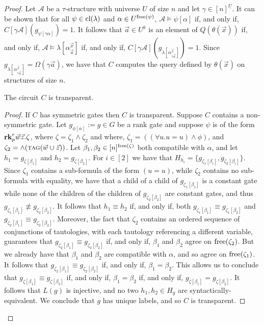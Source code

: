 \documentclass[../paper.tex]{subfiles}
\begin{document}
\begin{proof}
Let $\mathcal{A}$ be a $\tau$-structure with universe $U$ of size $n$ and let
$\gamma \in [n]^{\underline{U}}$. It can be shown that for all $\psi \in
\mathrm{cl}(\lambda)$ and $\alpha \in U^{\mathrm{free}(\psi)}$, $\mathcal{A} \models
\psi[\alpha]$ if, and only if, $C[\gamma \mathcal{A}](g_{\psi[\gamma\alpha]}) =
1$. It follows that $\vec{a} \in U^k$ is an element of $Q(\theta(\vec{x}))$ if,
and only if, $\mathcal{A} \models \lambda[\alpha^{\vec{x}}_{\vec{a}}]$ if, and
only if, $C[\gamma \mathcal{A}](g_{\lambda[\alpha^{\vec{x}}_{\gamma \vec{a}}]})
= 1$. Since $g_{\lambda [\alpha^{\vec{x}}_{\gamma \vec{a}}]} = \Omega (\gamma
\vec{a})$, we have that $C$ computes the query defined by $\theta(\vec{x})$ on
structures of size $n$.

\begin{claim}
  The circuit $C$ is transparent.
\end{claim}
\begin{proof}
  If $C$ has symmetric gates then $C$ is transparent. Suppose $C$ contains a
  non-symmetric gate. Let $g_{\phi[\alpha]}:= g \in G$ be a rank gate and
  suppose $\psi$ is of the form $\text{\textbf{rk}}^r_p \vec{w} \vec{z}. \zeta$, where $\zeta
  = \zeta_1 \land \zeta_2$ and where, $\zeta_1 = ((\forall u. u = u) \land
  \phi)$, and $\zeta_2 = \land ({\normalfont\textsc{tag}}(\vec{w} \cup \vec{z}))$. Let $\beta_1 ,
  \beta_2 \in [n]^{\mathrm{free}(\zeta)}$ both compatible with $\alpha$, and let $h_1 =
  g_{\zeta[\beta_1]}$ and $h_2 = g_{\zeta[\beta_2]}$. For $i \in [2]$ we have
  that $H_{h_i} = \{g_{\zeta_1[\beta_i]}, g_{\zeta_2[\beta_i]}\}$. Since
  $\zeta_1$ contains a sub-formula of the form $(u = u)$, while $\zeta_2$
  contains no sub-formula with equality, we have that a child of a child of
  $g_{\zeta_1[\beta_1]}$ is a constant gate while none of the children of the
  children of $g_{\zeta_2[\beta_2]}$ are constant gates, and thus $g_{\zeta_1
    [\beta_1]} \not\equiv g_{\zeta_2[\beta_2]}$. It follows that $h_1 \equiv
  h_2$ if, and only if, both $g_{\zeta_1 [\beta_1]} \equiv g_{\zeta_1
    [\beta_2]}$ and $g_{\zeta_2[\beta_1]} \equiv g_{\zeta_2[\beta_2]}$.
  Moreover, the fact that $\zeta_2$ contains an ordered sequence of conjunctions
  of tautologies, with each tautology referencing a different variable,
  guarantees that $g_{\zeta_2[\beta_1]} \equiv g_{\zeta_2[\beta_2]}$ if, and
  only if, $\beta_1$ and $\beta_2$ agree on $\mathrm{free}(\zeta_2)$. But we already
  have that $\beta_1$ and $\beta_2$ are compatible with $\alpha$, and so agree
  on $\mathrm{free}(\zeta_1)$. It follows that $g_{\zeta_2[\beta_1]} \equiv
  g_{\zeta_2[\beta_2]}$ if, and only if, $\beta_1 = \beta_2$. This allows us to
  conclude that $g_{\zeta[\beta_1]} \equiv g_{\zeta[\beta_2]}$ if, and only if,
  $\beta_1 = \beta_2$ if, and only if, $g_{\zeta[\beta_1]} =
  g_{\zeta[\beta_2]}$. It follows that $L(g)$ is injective, and no two $h_1, h_2
  \in H_g$ are syntactically-equivalent. We conclude that $g$ has unique labels,
  and so $C$ is transparent.
\end{proof}


\end{proof}
\end{document}
